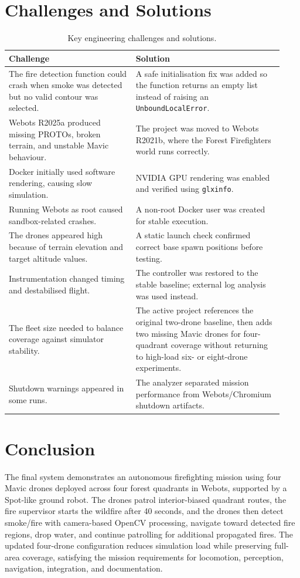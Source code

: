 \documentclass[10pt,a4paper]{article}
\begin{document}
\section{Challenges and Solutions}
\begin{table}[H]
\centering
\caption{Key engineering challenges and solutions.}
\small
\begin{tabular}{p{0.43\linewidth} p{0.50\linewidth}}
\toprule
Challenge & Solution \\
\midrule
The fire detection function could crash when smoke was detected but no valid contour was selected. & A safe initialisation fix was added so the function returns an empty list instead of raising an \texttt{UnboundLocalError}. \\
Webots R2025a produced missing PROTOs, broken terrain, and unstable Mavic behaviour. & The project was moved to Webots R2021b, where the Forest Firefighters world runs correctly. \\
Docker initially used software rendering, causing slow simulation. & NVIDIA GPU rendering was enabled and verified using \texttt{glxinfo}. \\
Running Webots as root caused sandbox-related crashes. & A non-root Docker user was created for stable execution. \\
The drones appeared high because of terrain elevation and target altitude values. & A static launch check confirmed correct base spawn positions before testing. \\
Instrumentation changed timing and destabilised flight. & The controller was restored to the stable baseline; external log analysis was used instead. \\
The fleet size needed to balance coverage against simulator stability. & The active project references the original two-drone baseline, then adds two missing Mavic drones for four-quadrant coverage without returning to high-load six- or eight-drone experiments. \\
Shutdown warnings appeared in some runs. & The analyzer separated mission performance from Webots/Chromium shutdown artifacts. \\
\bottomrule
\end{tabular}
\end{table}

\section{Conclusion}
The final system demonstrates an autonomous firefighting mission using four Mavic drones deployed across four forest quadrants in Webots, supported by a Spot-like ground robot. The drones patrol interior-biased quadrant routes, the fire supervisor starts the wildfire after 40 seconds, and the drones then detect smoke/fire with camera-based OpenCV processing, navigate toward detected fire regions, drop water, and continue patrolling for additional propagated fires. The updated four-drone configuration reduces simulation load while preserving full-area coverage, satisfying the mission requirements for locomotion, perception, navigation, integration, and documentation.
\end{document}
